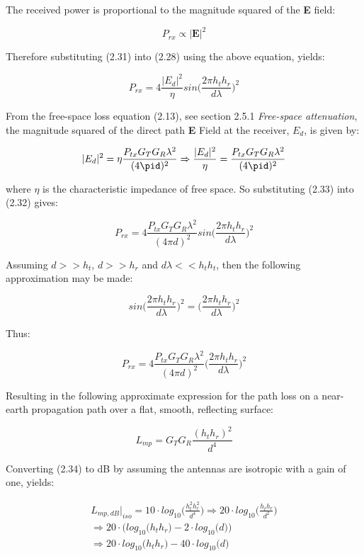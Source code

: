The received power is proportional to the magnitude squared of the \textbf{E} field:

$$P_{rx} \propto |\textbf{E}|^2$$


Therefore substituting (2.31) into (2.28) using the above equation, yields:

\begin{equation}
  P_{rx} = 4 \frac{|E_d|^2}{\eta}sin\Big(\frac{2 \pi h_th_r}{d\lambda}\Big)^2
\end{equation}

From the free-space loss equation (2.13), see section 2.5.1 \textit{Free-space attenuation}, the magnitude squared of the direct path \textbf{E} Field at the receiver, $E_d$, is given by:

\begin{equation}
  |E_d|^2 = \eta \frac{P_{tx}G_TG_R\lambda^2}{(4\pid)^2} \Rightarrow \frac{|E_d|^2}{\eta} = \frac{P_{tx}G_TG_R\lambda^2}{(4\pid)^2}
\end{equation}

where $\eta$ is the characteristic impedance of free space. So substituting (2.33) into (2.32) gives:

\begin{equation}
  P_{rx} = 4 \frac{P_{tx}G_TG_R\lambda^2}{(4\pi d)^2}sin\Big(\frac{2 \pi h_th_r}{d\lambda}\Big)^2
\end{equation}

Assuming $d>>h_t$, $d>>h_r$ and $d\lambda << h_th_t$, then the following approximation may be made:

$$sin\Big(\frac{2 \pi h_th_r}{d\lambda}\Big)^2=\Big(\frac{2 \pi h_th_r}{d\lambda}\Big)^2$$

Thus:

\begin{equation}
  P_{rx} = 4 \frac{P_{tx}G_TG_R\lambda^2}{(4\pi d)^2}\Big(\frac{2 \pi h_th_r}{d\lambda}\Big)^2
\end{equation}

Resulting in the following approximate expression for the path loss on a near-earth propagation path over a flat, smooth, reflecting surface:

\begin{equation}
  L_{mp}= G_TG_R \frac{(h_th_r)^2}{d^4}
\end{equation}

Converting (2.34) to dB by assuming the antennas are isotropic with a gain of one, yields:

\begin{equation}
\begin{split}
  L_{mp,dB}|_{iso} = 10 \cdot log_{10}\Big(\frac{h_t^2h_r^2}{d^4}\Big) \Rightarrow 20 \cdot log_{10}\Big(\frac{h_th_r}{d^2}\Big) \\ \Rightarrow  20 \cdot (log_{10}\Big(h_th_r\Big) - 2 \cdot log_{10}\Big(d\Big)\Big) \\ \Rightarrow  20 \cdot log_{10}\Big(h_th_r\Big) - 40 \cdot log_{10}\Big(d\Big)
\end{split}
\end{equation}

